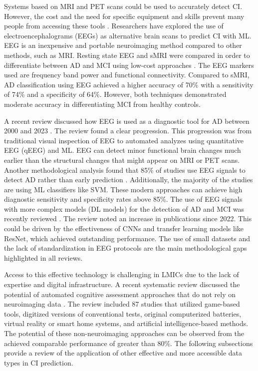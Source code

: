 Systems based on MRI and PET scans could be used to accurately detect CI. However, the cost and the need for specific equipment and skills prevent many people from accessing these tools \cite{Geethanath2019Accessible}. Researchers have explored the use of electroencephalograms (EEGs) as alternative brain scans to predict CI with ML. EEG is an inexpensive and portable neuroimaging method compared to other methods, such as MRI. Resting state EEG and sMRI were compared in order to differentiate between AD and MCI using low-cost approaches \cite{Farina2020Comparison}. The EEG markers used are frequency band power and functional connectivity. Compared to sMRI, AD classification using EEG achieved a higher accuracy of 70\% with a sensitivity of 74\% and a specificity of 64\%. However, both techniques demonstrated moderate accuracy in differentiating MCI from healthy controls.

A recent review discussed how EEG is used as a diagnostic tool for AD between 2000 and 2023 \cite{Ehteshamzad2024Assessing}. The review found a clear progression. This progression was from traditional visual inspection of EEG to automated analyzes using quantitative EEG (qEEG) and ML. EEG can detect minor functional brain changes much earlier than the structural changes that might appear on MRI or PET scans. Another methodological analysis found that 85\% of studies use EEG signals to detect AD rather than early prediction \cite{Modir2023Systematic}. Additionally, the majority of the studies are using ML classifiers like SVM. These modern approaches can achieve high diagnostic sensitivity and specificity rates above 85\%. The use of EEG signals with more complex models (DL models) for the detection of AD and MCI was recently reviewed \cite{Acharya2025Deep}. The review noted an increase in publications since 2022. This could be driven by the effectiveness of CNNs and transfer learning models like ResNet, which achieved outstanding performance. The use of small datasets and the lack of standardization in EEG protocols are the main methodological gaps highlighted in all reviews.

Access to this effective technology is challenging in LMICs due to the lack of expertise and digital infrastructure. A recent systematic review discussed the potential of automated cognitive assessment approaches that do not rely on neuroimaging data \cite{Babatope2024Potential}. The review included 87 studies that utilized game-based tools, digitized versions of conventional tests, original computerized batteries, virtual reality or smart home systems, and artificial intelligence-based methods. The potential of these non-neuroimaging approaches can be observed from the achieved comparable performance of greater than 80\%. The following subsections provide a review of the application of other effective and more accessible data types in CI prediction.

